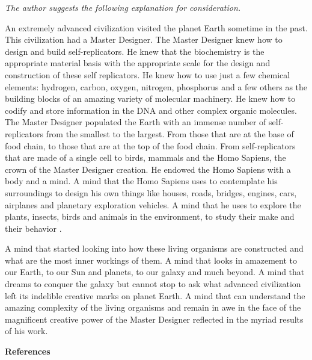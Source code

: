 \bigskip

\textit{The author suggests the following explanation for
consideration.}


\bigskip

An extremely advanced civilization visited the planet Earth sometime in
the past. This civilization had a Master Designer.  The Master Designer
knew how to design and build self-replicators. He knew that the
biochemistry is the appropriate material basis with the appropriate
scale for the design and construction of these self replicators. He
knew how to use just a few chemical elements: hydrogen, carbon, oxygen,
nitrogen, phosphorus and a few others as the building blocks of an
amazing variety of molecular machinery. He knew how to codify and store
information in the DNA and other complex organic molecules. The Master
Designer populated the Earth with an immense number of self-replicators
from the smallest to the largest. From those that are at the base of
food chain, to those that are at the top of the food chain. From
self-replicators that are made of a single cell to birds, mammals and
the Homo Sapiens, the crown of the Master Designer creation.  He
endowed the Homo Sapiens with a body and a mind. A mind that the Homo
Sapiens uses to contemplate his surroundings to design his own things
like houses, roads, bridges, engines, cars, airplanes and planetary
exploration vehicles. A mind that he uses to explore the plants,
insects, birds and animals in the environment, to study their make and
their behavior .

A mind that started looking into how these living organisms are
constructed and what are the most inner workings of them. A mind that
looks in amazement to our Earth, to our Sun and planets, to our galaxy
and much beyond. A mind that dreams to conquer the galaxy but cannot
stop to ask what advanced civilization left its indelible creative
marks on planet Earth. A mind that can understand the amazing
complexity of the living organisms and remain in awe in the face of the
magnificent creative power of the Master Designer reflected in the
myriad results of his work.


\bigskip

{\bfseries
\hypertarget{RefHeading3168306210128}{}References}

